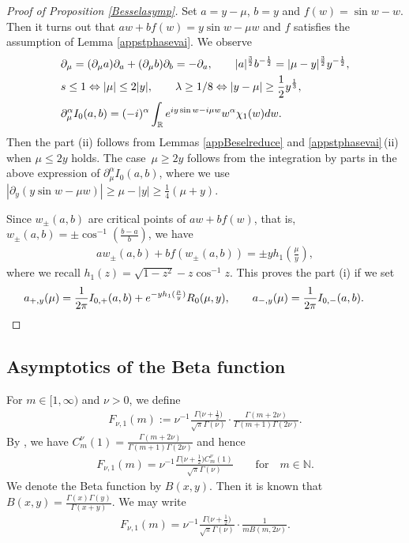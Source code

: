 \documentclass[10pt,a4paper]{article}
\numberwithin{equation}{section}
\def\R{\mathbb{R}}%
\def\a{\alpha}
\def\l{\lambda}
\def\m{\mu}
\def\n{\nu}
\def\pa{\partial}
\begin{document}
\begin{proof}[Proof of Proposition \ref{Besselasymp}]
Set $a=y-\m$, $b=y$ and $f(w)=\sin w-w$. Then it turns out that $aw+bf(w)=y\sin w-\m w$ and $f$ satisfies the assumption of Lemma \ref{appstphasevai}. We observe
\begin{align*}
&\pa_{\m}=(\pa_{\m} a)\pa_{a}+(\pa_{\m} b)\pa_{b}=-\pa_a,\qquad |a|^{\frac{3}{2}}b^{-\frac{1}{2}}=|\m-y|^{\frac{3}{2}}y^{-\frac{1}{2}},\\
&s\leq 1\Leftrightarrow |\m|\leq 2|y|,\qquad \l\geq 1/8\Leftrightarrow |y-\m|\geq \frac{1}{2}y^{\frac{1}{3}},\\
&\pa_{\m}^{\a}I_0(a,b)=(-{\rm i})^{\a}\int_{\R}{\rm e}^{{\rm i}y \sin w-{\rm i}\m w }w^{\a}\chi_1(w){\rm d}w.
\end{align*}
Then the part (ii) follows from Lemmas \ref{appBeselreduce} and \ref{appstphasevai}\,(ii) when $\m\leq 2y$ holds. The case~${\m\geq 2y}$ follows from the integration by parts in the above expression of $\pa_{\m}^{\a}I_0(a,b)$, where we use $|\pa_y(y \sin w-\m w)|\geq \m-|y|\geq \frac{1}{4}(\m+y)$.

Since $w_{\pm}(a,b)$ are critical points of $aw+bf(w)$, that is, $w_{\pm}(a,b)=\pm\cos^{-1}(\frac{b-a}{b})$, we have
\begin{align*}
aw_{\pm}(a,b)+bf(w_{\pm}(a,b))=\pm yh_1\left(\frac{\m}{y}\right),
\end{align*}
where we recall $h_1(z)=\sqrt{1-z^2}-z\cos^{-1}z$. This proves the part (i) if we set
\begin{align*}
a_{+,y}(\m)=\frac{1}{2\pi}I_{0,+}(a,b)+ {\rm e}^{-yh_1(\frac{\m}{y})} R_0(\m,y),\qquad a_{-,y}(\m)=\frac{1}{2\pi}I_{0,-}(a,b).\tag*{\qed}
\end{align*}\renewcommand{\qed}{}
\end{proof}

\subsection{Asymptotics of the Beta function}\label{subsecasymbeta}

For $m\in [1,\infty)$ and $\n>0$, we define
\begin{align}\label{Fnu1def}
F_{\n,1}(m):=\n^{-1}\frac{\Gamma\bigl(\n+\frac{1}{2}\bigr)}{\sqrt{\pi}\Gamma(\n)}\cdot \frac{\Gamma(m+2\n)}{\Gamma(m+1)\Gamma(2\n)}.
\end{align}
By \cite[Fact 4.8, equation~(4.30)]{BKO}, we have $C_m^{\n}(1)=\frac{\Gamma(m+2\n)}{\Gamma(m+1)\Gamma(2\n)}$ and hence
\begin{align}\label{Fnu1Gegen}
F_{\n,1}(m)=\n^{-1}\frac{\Gamma\bigl(\n+\frac{1}{2}\bigr)C_m^{\n}(1)}{\sqrt{\pi}\Gamma(\n)}\qquad \text{for}\quad m\in\mathbb{N}.
\end{align}
We denote the Beta function by $B(x,y)$. Then it is known that $B(x,y)=\frac{\Gamma(x)\Gamma(y)}{\Gamma(x+y)}$. We may write
\begin{align}\label{Fnu1beta}
F_{\n,1}(m)=\n^{-1}\frac{\Gamma\bigl(\n+\frac{1}{2}\bigr)}{\sqrt{\pi}\Gamma(\n)}\cdot \frac{1}{mB(m,2\n)}.
\end{align}
\end{document}
